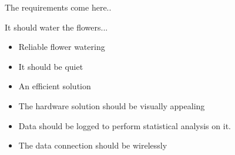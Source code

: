 The requirements come here..

It should water the flowers...
\begin{itemize}
\item Reliable flower watering
\item It should be quiet
\item An efficient solution
\item The hardware solution should be visually appealing
\item Data should be logged to perform statistical analysis on it.
\item The data connection should be wirelessly
\end{itemize}